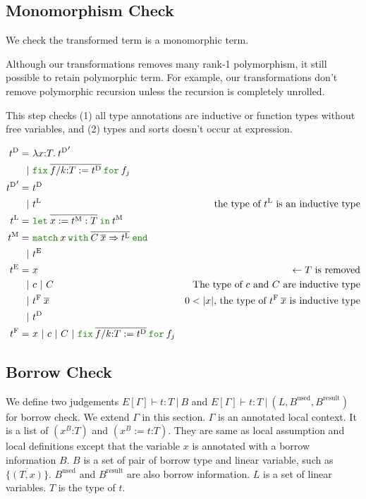 \documentclass[a4paper,fleqn]{article}
\newcommand{\kwlet}{\mbox{\color{mygreen}\ttfamily let}}
\newcommand{\kwin}{\mbox{\color{mygreen}\ttfamily in}}
\newcommand{\kwmatch}{\mbox{\color{mygreen}\ttfamily match}}
\newcommand{\kwwith}{\mbox{\color{mygreen}\ttfamily with}}
\newcommand{\kwend}{\mbox{\color{mygreen}\ttfamily end}}
\newcommand{\kwfix}{\mbox{\color{mygreen}\ttfamily fix}}
\newcommand{\kwfor}{\mbox{\color{mygreen}\ttfamily for}}
\newcommand{\lamT}[3]{\lambda #1\mathord{:}#2.\:#3}
\newcommand{\lassum}[2]{(#1\mathord{:}#2)}
\newcommand{\ldef}[3]{(#1:=#2\mathord{:}#3)}
\newcommand{\letinM}[3]{\kwlet\:\rep{#1:=#2}\:\kwin\:#3}
\newcommand{\omatch}[2]{\kwmatch\:#1\:\kwwith\:{#2}\:\kwend}
\newcommand{\ofix}[2]{\kwfix\:{#1}\:\kwfor\:{#2}}
\newcommand{\tD}{{t^\mathrm{D}}}
\newcommand{\tE}{{t^\mathrm{E}}}
\newcommand{\tL}{{t^\mathrm{L}}}
\newcommand{\tM}{{t^\mathrm{M}}}
\newcommand{\tF}{{t^\mathrm{F}}}
\newcommand{\rep}[1]{\overline{#1}}
\begin{document}
\subsection{Monomorphism Check}\label{sec:check-monomorphism}

We check the transformed term is a monomorphic term.

Although our transformations removes many rank-1 polymorphism,
it still possible to retain polymorphic term.
For example, our transformations don't remove polymorphic recursion unless
the recursion is completely unrolled.

This step checks
(1) all type annotations are inductive or function types without free variables, and
(2) types and sorts doesn't occur at expression.

\begin{align*}
  \tD =&\ \lamT{x}{T}{\tD'} \\
      |&\ \ofix{\overline{f/k{:}T:=\tD}}{f_j} \\
  \tD' =&\ \tD \\
       |&\ \tL & \text{the type of $\tL$ is an inductive type} \\
  \tL =&\ \letinM{x}{\tM:T}{\tM} \\
  \tM =&\ \omatch{x}{\overline{C\:\overline{x}\Rightarrow \tL}} \\
      |&\ \tE \\
  \tE =&\ x & \leftarrow \text{$T$ is removed} \\
    |&\ c ~|~ C & \text{The type of $c$ and $C$ are inductive type} \\
    |&\ \tF\:\rep{x} & \text{$0 < |x|$, the type of $\tF\:\rep{x}$ is inductive type}  \\
    |&\ \tD \\
  \tF =&\ x ~|~ c ~|~ C ~|~ \ofix{\overline{f/k{:}T:=\tD}}{f_j}
\end{align*}

\subsection{Borrow Check}\label{sec:borrow-check}

We define two judgements $E[\Gamma] \vdash t:T~|~B$ and $E[\Gamma] \vdash t:T~|~(L, B^\text{used}, B^\text{result})$ for borrow check.
We extend $\Gamma$ in this section.
$\Gamma$ is an annotated local context.
It is a list of $\lassum{x^B}{T}$ and $\ldef{x^B}{t}{T}$.
They are same as local assumption and local definitions except that
the variable $x$ is annotated with a borrow information $B$.
$B$ is a set of pair of borrow type and linear variable, such as $\{\overline{(T,x)}\}$.
$B^\text{used}$ and $B^\text{result}$ are also borrow information.
$L$ is a set of linear variables.
$T$ is the type of $t$.
\end{document}
